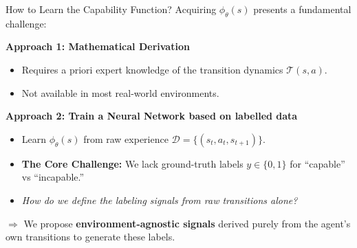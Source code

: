 \documentclass[11pt,aspectratio=169]{beamer}
\begin{document}
\begin{frame}{How to Learn the Capability Function?}
    Acquiring $\phi_\theta(s)$ presents a fundamental challenge:

    \vspace{0.3cm}
    \textbf{Approach 1: Mathematical Derivation}
    \begin{itemize}
        \item Requires a priori expert knowledge of the transition dynamics $\mathcal{T}(s, a)$.
        \item Not available in most real-world environments.
    \end{itemize}

    \vspace{0.3cm}
    \textbf{Approach 2: Train a Neural Network based on labelled data}
    \begin{itemize}
        \item Learn $\phi_\theta(s)$ from raw experience $\mathcal{D} = \{(s_t, a_t, s_{t+1})\}$.
        \item \textbf{The Core Challenge:} We lack ground-truth labels $y \in \{0, 1\}$ for ``capable'' vs ``incapable.''
        \item \textit{How do we define the labeling signals from raw transitions alone?}
    \end{itemize}

    \vspace{0.3cm}
    $\Rightarrow$ We propose \textbf{environment-agnostic signals} derived purely from the agent's own transitions to generate these labels.
\end{frame}
\end{document}
